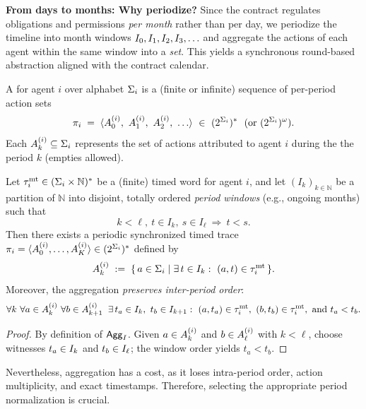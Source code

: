 \documentclass{article}
\begin{document}
  \noindent\textbf{From days to months: Why periodize?}
  Since the contract regulates obligations and permissions \emph{per month} rather than per day, we periodize
  the timeline into month windows $I_{0},I_{1},I_{2},I_{3},\ldots$ and aggregate the actions of each agent
  within the same window into a \emph{set}. This yields a synchronous round-based abstraction aligned with the contract calendar.
  
  \begin{definition}
  A  for agent $i$ over alphabet $\Sigma_{i}$ is a (finite or infinite)
  sequence of per-period action sets
  \[
  \pi_i \;=\; \trace{\Aik{i}{0},\ \Aik{i}{1},\ \Aik{i}{2},\ \dots}\ \in\ \wordsets{\Sig{i}}^{*}\ \ (\text{or }\wordsets{\Sig{i}}^{\omega}).
  \]
  Each $A^{(i)}_{k}\subseteq \Sigma_{i}$ represents the set of actions attributed to agent $i$ during the the period $k$
  (empties allowed).
  \end{definition}
  
  \begin{lemma}
  \label{lem:agg-to-periodic}
  Let \(\tau^{\mathrm{mt}}_i\in(\Sigma_i\times\mathbb{N})^{*}\) be a (finite) timed word for agent \(i\), and let
  \((I_k)_{k\in\mathbb{N}}\) be a partition of \(\mathbb{N}\) into disjoint, totally ordered \emph{period windows}
  (e.g., ongoing months) such that
  \[
  k<\ell,\ t\in I_k,\ s\in I_{\ell}\ \Rightarrow\ t<s.
  \]
  Then there exists a periodic synchronized timed trace \(\pi_i=\langle A^{(i)}_0,\dots,A^{(i)}_K \rangle \in(2^{\Sigma_i})^{*}\) defined by
  \[
  A^{(i)}_k \;:=\; \{\, a\in\Sigma_i \mid \exists\, t\in I_k:\ (a,t)\in \tau^{\mathrm{mt}}_i \,\}.
  \]
  Moreover, the aggregation \emph{preserves inter-period order}:
  \[
  \forall k\ \forall a\in A^{(i)}_k\ \forall b\in A^{(i)}_{k+1}\;\;
  \exists\, t_a\in I_k,\ t_b\in I_{k+1}:
  \ (a,t_a)\in\tau^{\mathrm{mt}}_i,\ (b,t_b)\in\tau^{\mathrm{mt}}_i,\ \text{and } t_a<t_b.
  \]
  \end{lemma}
  
  \begin{proof}
  By definition of $\mathsf{Agg}_{I}$. Given $a\in A^{(i)}_{k}$ and $b\in A^{(i)}_{\ell}$ with $k<\ell$, choose witnesses
  $t_a\in I_{k}$ and $t_b\in I_{\ell}$; the window order yields $t_a<t_b$.
  \end{proof}
  
  Nevertheless, aggregation has a cost, as it loses intra-period order, action multiplicity, and exact timestamps. Therefore, selecting the appropriate period normalization is crucial.
  
\end{document}

